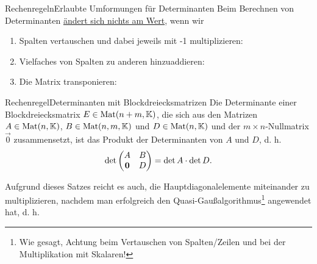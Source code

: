 \begin{Satz}
{Rechenregeln}{Erlaubte Umformungen für Determinanten}
Beim Berechnen von Determinanten \underline{ändert sich nichts am Wert}, wenn wir
\begin{enumerate}
    \item Spalten vertauschen und dabei jeweils mit -1 multiplizieren:
    \item Vielfaches von Spalten zu anderen hinzuaddieren:
    \item Die Matrix transponieren:
\end{enumerate}
\end{Satz}
\begin{Satz}
{Rechenregel}{Determinanten mit Blockdreiecksmatrizen}
Die Determinante einer Blockdreiecksmatrix $E\in\text{Mat}(n+m,\mathbb{K})$, die sich aus den Matrizen $A\in\text{Mat}(n,\mathbb{K})$, $B\in\text{Mat}(n,m,\mathbb{K})$ und $D\in \text{Mat}(n,\mathbb{K})$ und der $m\times n$-Nullmatrix $\Vec{0}$ zusammensetzt, ist das Produkt der Determinanten von $A$ und $D$, d. h.
\begin{equation}
    \det\begin{pmatrix}A&B\\{\text{\boldmath${0}$}}&D\end{pmatrix}=\det A\cdot \det D.
\end{equation}
\end{Satz}
Aufgrund dieses Satzes reicht es auch, die Hauptdiagonalelemente miteinander zu multiplizieren, nachdem man erfolgreich den Quasi-Gaußalgorithmus\footnote{Wie gesagt, Achtung beim Vertauschen von Spalten/Zeilen und bei der Multiplikation mit Skalaren!} angewendet hat, d. h.
